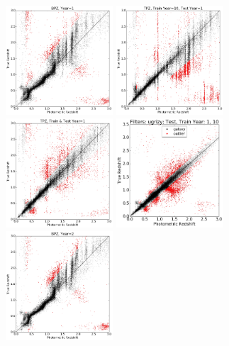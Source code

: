 \documentclass[DM,lsstdraft,toc]{lsstdoc}
\begin{document}
\clearpage

\begin{figure}
\begin{center}
\includegraphics[width=4.0cm]{figures/BPZ_Euclid_Y1_tzpz.png}
\includegraphics[width=4.0cm]{figures/TPZ_Euclid_10Y1_tzpz.png}
\includegraphics[width=4.0cm]{figures/TPZ_Euclid_1Y1_tzpz.png}
\includegraphics[width=4.0cm]{figures/CM_10Y1_tzpz.png}
\includegraphics[width=4.0cm]{figures/BPZ_Euclid_Y2_tzpz.png}

\end{center}
\end{figure}
\end{document}
